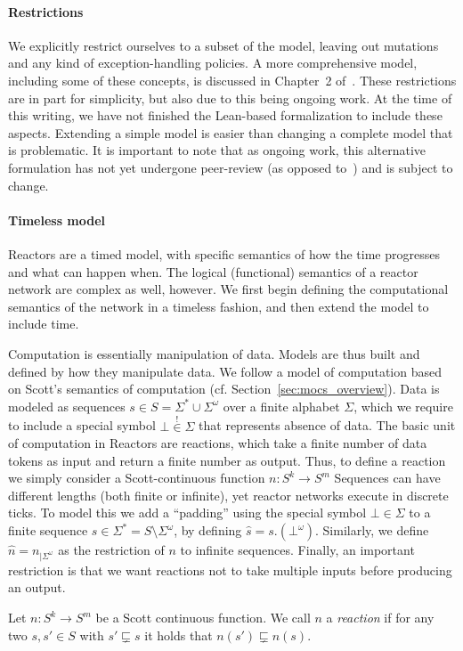 \paragraph{Restrictions}

We explicitly restrict ourselves to a subset of the model, leaving out mutations and any kind of exception-handling policies.
A more comprehensive model, including some of these concepts, is discussed in Chapter~2 of~\cite{lohstroh_phdthesis}.
These restrictions are in part for simplicity, but also due to this being ongoing work.
At the time of this writing, we have not finished the Lean-based formalization to include these aspects.
Extending a simple model is easier than changing a complete model that is problematic.
It is important to note that as ongoing work, this alternative formulation has not yet undergone peer-review (as opposed to~\cite{lohstroh_cyphy19}) and is subject to change.

\paragraph{Timeless model}

Reactors are a timed model, with specific semantics of how the time progresses and what can happen when.
The logical (functional) semantics of a reactor network are complex as well, however.
We first begin defining the computational semantics of the network in a timeless fashion, and then extend the model to include time.

Computation is essentially manipulation of data.
Models are thus built and defined by how they manipulate data.
We follow a model of computation based on Scott's semantics of computation (cf. Section~\ref{sec:mocs_overview}).
Data is modeled as sequences $s \in S = \Sigma^* \cup \Sigma^\omega$ over a finite alphabet $\Sigma$, which we require to include a special symbol $\bot \overset{!}{\in} \Sigma$ that represents absence of data.
The basic unit of computation in Reactors are reactions, which take a finite number of data tokens as input and return a finite number as output.
Thus, to define a reaction we simply consider a Scott-continuous function $n : S^k \rightarrow S^m$
Sequences can have different lengths (both finite or infinite), yet reactor networks execute in discrete ticks.
To model this we add a ``padding'' using the special symbol $\bot \in \Sigma$ to a finite sequence $s \in \Sigma^* = S \setminus \Sigma^\omega$, by defining $\hat s  = s.(\bot^\omega)$. 
Similarly, we define $\hat n = n_{\big| \Sigma^\omega}$ as the restriction of $n$ to infinite sequences. 
Finally, an important restriction is that we want reactions not to take multiple inputs before producing an output. 
\begin{defn}[Reaction]
Let $n : S^k \rightarrow S^m$ be a Scott continuous function. 
We call $n$ a \emph{reaction} if for any two $s, s' \in S$ with $s' \sqsubsetneq s$ it holds that $n(s') \sqsubsetneq n(s)$.
\end{defn}

